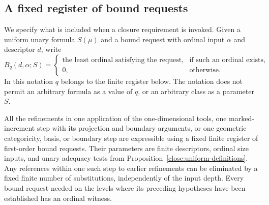 \subsection{A fixed register of bound requests}

We specify what is included when a closure requirement is invoked.
Given a uniform unary formula $S(\mu)$ and a bound request with ordinal
input $\alpha$ and descriptor $d$, write
\[
 B_q(d,\alpha;S)
 =\begin{cases}
 \text{the least ordinal satisfying the request},&
                         \text{if such an ordinal exists},\\
 0,&\text{otherwise}.
 \end{cases}
\]
In this notation $q$ belongs to the finite register below.  The notation
does not permit an arbitrary formula as a value of $q$, or an arbitrary
class as a parameter $S$.

\begin{lemma}
\label{close:recipe-register}
All the refinements in one application of the one-dimensional tools,
one marked-increment step with its projection and boundary arguments,
or one geometric categoricity, basis, or boundary step are expressible
using a fixed finite register of first-order bound requests.  Their
parameters are finite descriptors, ordinal size inputs, and unary
adequacy tests from Proposition~\ref{close:uniform-definitions}.
Any references within one such step to earlier refinements can be
eliminated by a fixed finite number of substitutions, independently of
the input depth.  Every bound request needed on the levels where its
preceding hypotheses have been established has an ordinal witness.
\end{lemma}

